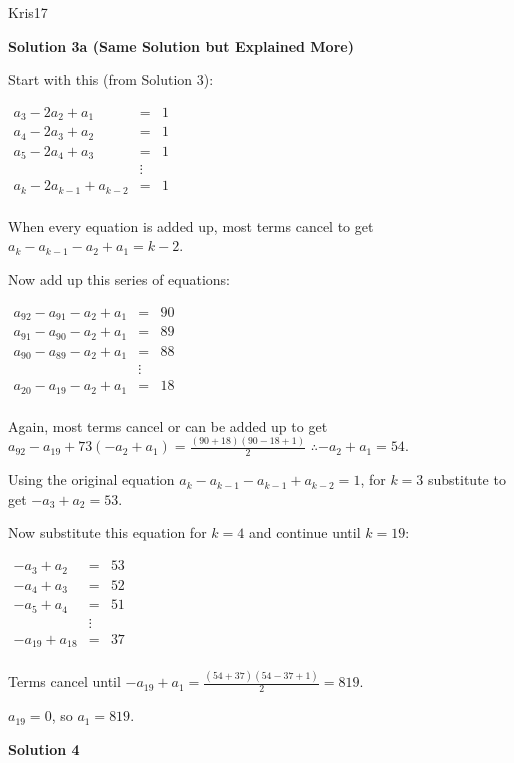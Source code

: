 \begin{enumerate}
 Kris17

 



\textbf{Solution 3a (Same Solution but Explained More)}

Start with this (from Solution 3):

 $\begin{array}{rcl} a_3-2a_2+a_1&=&1\\ a_4-2a_3+a_2&=&1\\ a_5-2a_4+a_3&=&1\\ &\vdots\\ a_k-2a_{k-1}+a_{k-2} &= &1\\ \end{array}$

 When every equation is added up, most terms cancel to get $a_k-a_{k-1}-a_2+a_1=k-2$.

 Now add up this series of equations:

 $\begin{array}{rcl} a_{92}-a_{91}-a_2+a_1&=&90\\ a_{91}-a_{90}-a_2+a_1&=&89\\ a_{90}-a_{89}-a_2+a_1&=&88\\ &\vdots\\ a_{20}-a_{19}-a_2+a_1&=&18\\ \end{array}$

 Again, most terms cancel or can be added up to get $a_{92}-a_{19}+73(-a_2+a_1)=\frac{(90+18)(90-18+1)}{2}$ $\therefore -a_2+a_1 = 54$.

 Using the original equation $a_k-a_{k-1}-a_{k-1}+a_{k-2}=1$, for $k=3$ substitute to get $-a_3+a_2=53$.

 Now substitute this equation for $k=4$ and continue until $k=19$:

 $\begin{array}{rcl} -a_3+a_2&=&53\\ -a_4+a_3&=&52\\ -a_5+a_4&=&51\\ &\vdots\\ -a_{19}+a_{18}&=&37\\ \end{array}$

 Terms cancel until $-a_{19}+a_1 = \frac{(54+37)(54-37+1)}{2} = 819$.

 $a_{19} = 0$, so $a_1=\boxed{819}$.

 



\textbf{Solution 4}


\end{enumerate}
